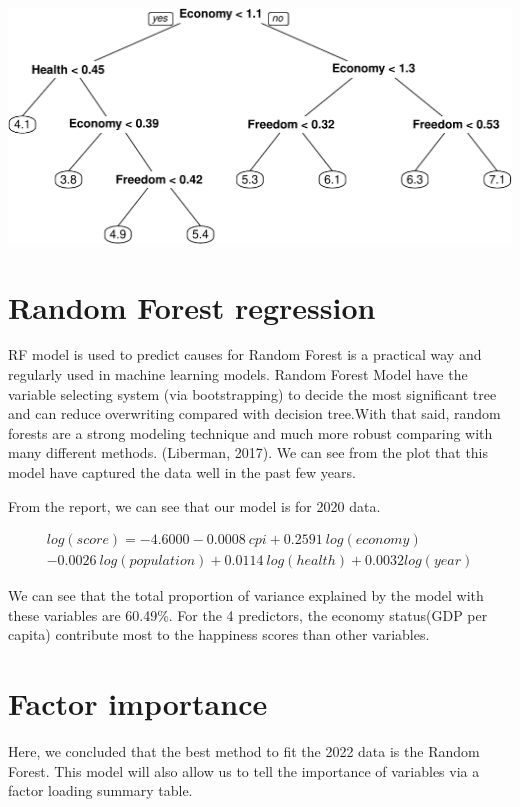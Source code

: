 \documentclass[11pt,a4paper,]{article}
\begin{document}
\includegraphics{Assignment4_files/figure-latex/unnamed-chunk-7-1.pdf}

\hypertarget{random-forest-regression}{%
\section{Random Forest regression}\label{random-forest-regression}}

RF model is used to predict causes for Random Forest is a practical way and regularly used in machine learning models. Random Forest Model have the variable selecting system (via bootstrapping) to decide the most significant tree and can reduce overwriting compared with decision tree.With that said, random forests are a strong modeling technique and much more robust comparing with many different methods. (Liberman, 2017). We can see from the plot that this model have captured the data well in the past few years.

From the report, we can see that our model is for 2020 data.

\[
\begin{aligned}
log(score)= -4.6000-0.0008\ cpi+0.2591\ log(economy)\\-0.0026\ log(population)+0.0114\ log(health)+0.0032log(year)
\end{aligned}
\]

We can see that the total proportion of variance explained by the model with these variables are 60.49\%. For the 4 predictors, the economy status(GDP per capita) contribute most to the happiness scores than other variables.

\hypertarget{factor-importance}{%
\section{Factor importance}\label{factor-importance}}

Here, we concluded that the best method to fit the 2022 data is the Random Forest. This model will also allow us to tell the importance of variables via a factor loading summary table.
\end{document}
